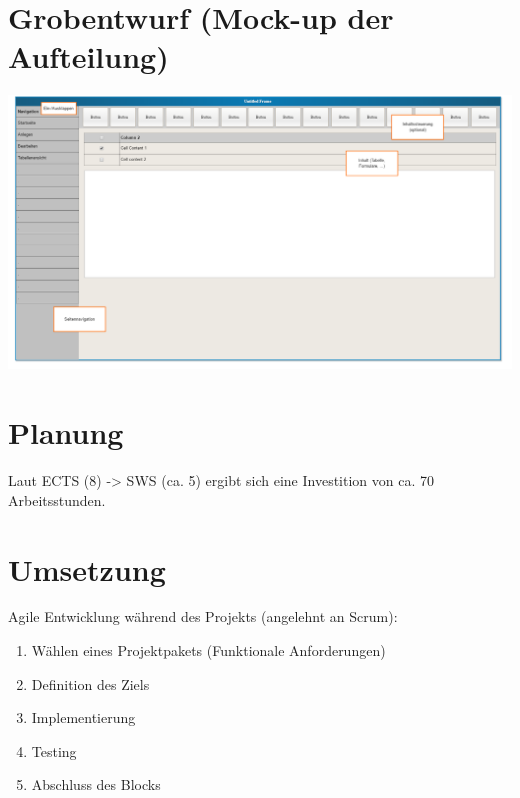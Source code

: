 \documentclass[a4paper]{scrartcl}
\begin{document}
\pagebreak
\eject

\section{Grobentwurf (Mock-up der Aufteilung)}

\begin{minipage}{\textwidth}
	\centering
	\includegraphics[width=1\textwidth]{mockupaufteilung.png}
	\label{Seitenaufbau}
\end{minipage}

\pagebreak
\eject

\section{Planung}
Laut ECTS (8) -> SWS (ca. 5) ergibt sich eine Investition von ca. 70 Arbeitsstunden.

\section{Umsetzung}
Agile Entwicklung während des Projekts (angelehnt an Scrum):
\begin{enumerate}
	\item Wählen eines Projektpakets (Funktionale Anforderungen)
	\item Definition des Ziels
	\item Implementierung
	\item Testing
	\item Abschluss des Blocks
\end{enumerate}
\end{document}
